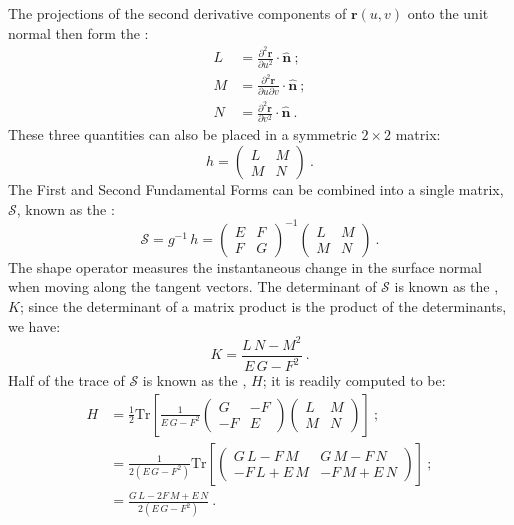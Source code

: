 The projections of the second derivative components of $\mathbf{r}(u,v)$ onto the unit normal then form the :
\begin{equation}
\begin{split}
	L &= \frac{\partial^2 \mathbf{r}}{\partial u^2}\cdot \hat{\mathbf{n}}\ ;\\
	M &= \frac{\partial^2 \mathbf{r}}{\partial u\partial v}\cdot \hat{\mathbf{n}}\ ;\\
	N&= \frac{\partial^2 \mathbf{r}}{\partial v^2}\cdot \hat{\mathbf{n}}\ .
\end{split}
\end{equation}
These three quantities can also be placed in a symmetric $2\times 2$ matrix:
\begin{equation}
	h = \begin{pmatrix} L & M\\ M & N\end{pmatrix}\ .
\end{equation}
The First and Second Fundamental Forms can be combined into a single matrix, $\mathcal{S}$, known as the :
\begin{equation}
	\mathcal{S} = g^{-1}\,h =  \begin{pmatrix} E & F\\ F & G\end{pmatrix}^{-1}\begin{pmatrix} L & M\\ M & N\end{pmatrix}\ .\label{\chabbr:eq:shapeoperator}
\end{equation}
The shape operator measures the instantaneous change in the surface normal when moving along the tangent vectors.  The determinant of $\mathcal{S}$ is known as the , $K$; since the determinant of a matrix product is the product of the determinants, we  have:
\begin{equation}
	K = \frac{L\,N-M^2}{E\,G-F^2}\ .\label{\chabbr:eq:GaussianCurvature}
\end{equation}
Half of the trace of $\mathcal{S}$ is known as the , $H$; it is readily computed to be:
\begin{equation}
\begin{split}
	H &= \frac{1}{2}\text{Tr}\left[ \frac{1}{E\,G-F^2}\begin{pmatrix} G & -F\\ -F & E\end{pmatrix}\begin{pmatrix} L & M\\ M & N\end{pmatrix}\right]\ ;\\
	&= \frac{1}{2(E\,G-F^2)} \text{Tr}\left[\begin{pmatrix} G\,L-F\,M& G\,M-F\,N\\ -F\,L+E\,M&-F\,M+E\,N\end{pmatrix}\right]\ ;\\
	&= \frac{G\,L-2F\,M+E\,N}{2(E\,G-F^2)}\ .
\end{split}
\label{\chabbr:eq:meancurvature}
\end{equation}
